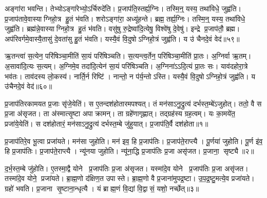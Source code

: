 अङ्गा॑रा भवन्ति।
तेभ्योऽङ्गा॑रेभ्यो॒ऽर्चिरुदे॑ति।
प्र॒जाप॑ति॒स्तर्ह्य॒ग्निः।
तस्मि॒न्॒ यस्य॒ तथा॑विधे॒ जुह्व॑ति।
प्र॒जाप॑तावे॒वास्याग्निहो॒त्र हु॒तं भ॑वति।
शरोऽङ्गा॑रा॒ अध्यू॑हन्ते।
ब्रह्म॒ तर्ह्य॒ग्निः।
तस्मि॒न्॒ यस्य॒ तथा॑विधे॒ जुह्व॑ति।
ब्रह्म॑न्ने॒वास्याग्निहो॒त्र हु॒तं भ॑वति।
वसु॑षु रु॒द्रेष्वा॑दि॒त्येषु॒ विश्वे॑षु दे॒वेषु॑।
इन्द्रे प्र॒जाप॑तौ॒ ब्रह्म\sn{}।
अप॑रिवर्गमे॒वास्यै॒तासु॑ दे॒वता॑सु हु॒तं भ॑वति।
यस्यै॒वं वि॒दुषोऽग्निहो॒त्रं जुह्व॑ति।
य उ॑ चैनदे॒वं वेद॑॥५९॥\anuvakamend[आ॒दि॒त्यास्तर्ह्य॒ग्निरिन्द्र॑ ए॒वास्याग्निहो॒त्र हु॒तं भ॑वति दे॒वेषु॑ च॒त्वारि॑ च (यद॒ग्निन्निहि॑तः प्रथ॒म सर्व॑ ए॒व नि॑त॒रामङ्गा॑रा॒ शरोऽङ्गा॑रा॒ ब्रह्म॒ वसु॑ष्व॒ष्टौ ॥ )]

ऋ॒तन्त्वा॑ स॒त्येन॒ परि॑षिञ्चा॒मीति॑ सा॒यं परि॑षिञ्चति।
स॒त्यन्त्व॒र्तेन॒ परि॑षिञ्चा॒मीति॑ प्रा॒तः।
अ॒ग्निर्वा ऋ॒तम्।
अ॒सावा॑दि॒त्यः स॒त्यम्।
अ॒ग्निमे॒व तदा॑दि॒त्येन॑ सा॒यं परि॑षिञ्चति।
अ॒ग्निना॑ऽऽदि॒त्यं प्रा॒तः सः।
याव॑दहोरा॒त्रे भव॑तः।
ताव॑दस्य लो॒कस्य॑।
नार्ति॒र्न रिष्टि॑।
नान्तो॒ न प॑र्य॒न्तोऽस्ति।
यस्यै॒वं वि॒दुषोऽग्निहो॒त्रं जुह्व॑ति।
य उ॑चैनदे॒वं वेद॑॥६०॥\anuvakamend[अ॒स्ति॒ द्वे च॑]




\clearpage
{}
\setcounter{anuvakam}{0}

प्र॒जाप॑तिरकामयत प्र॒जाः सृ॑जे॒येति॑।
स ए॒तन्दश॑होतारमपश्यत्।
तं मन॑साऽनु॒द्रुत्य॑ दर्भस्त॒म्बे॑ऽजुहोत्।
ततो॒ वै स प्र॒जा अ॑सृजत।
ता अ॑स्मात्सृ॒ष्टा अपाक्रामन्।
ता ग्रहे॑णागृह्णात्।
तद्ग्रह॑स्य ग्रह॒त्वम्।
यः का॒मये॑त॒ प्रजा॑ये॒येति॑।
स दश॑होतारं॒ मन॑साऽनु॒द्रुत्य॑ दर्भस्त॒म्बे जु॑हुयात्।
प्र॒जाप॑ति॒र्वै दश॑होता॥१॥

प्र॒जाप॑तिरे॒व भू॒त्वा प्रजा॑यते।
मन॑सा जुहोति।
मन॑ इव॒ हि प्र॒जाप॑तिः।
प्र॒जाप॑ते॒राप्त्यै।
पू॒र्णया॑ जुहोति।
पू॒र्ण इ॑व॒ हि प्र॒जाप॑तिः।
प्र॒जाप॑ते॒राप्त्यै।
न्यू॑नया जुहोति।
न्यू॑ना॒द्धि प्र॒जाप॑तिः प्र॒जा असृ॑जत।
प्र॒जाना॒ सृष्ट्यै॥२॥

द॒र्भ॒स्त॒म्बे जु॑होति।
ए॒तस्मा॒द्वै योने प्र॒जाप॑तिः प्र॒जा अ॑सृजत।
यस्मा॑दे॒व योने प्र॒जाप॑तिः प्र॒जा असृ॑जत।
तस्मा॑दे॒व योने॒ प्रजा॑यते।
ब्रा॒ह्म॒णो द॑क्षिण॒त उपास्ते।
ब्रा॒ह्म॒णो वै प्र॒जाना॑मुपद्र॒ष्टा।
उ॒प॒द्र॒ष्टु॒मत्ये॒व प्रजा॑यते।
ग्रहो॑ भवति।
प्र॒जाना सृ॒ष्टाना॒न्धृत्यै।
यं ब्राह्म॒णं वि॒द्यां वि॒द्वासं॒ यशो॒ नर्च्छेत्॥३॥

